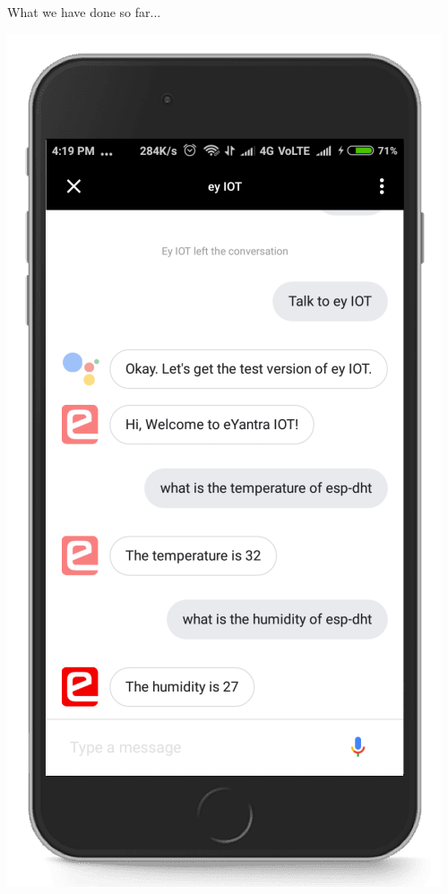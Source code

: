 \documentclass[10pt, a4paper]{beamer}
\begin{document}
\begin{frame}{What we have done so far...}
\begin{minipage}[b]{0.45\textwidth}
		\includegraphics[totalheight=6cm]{assistant.png}
	\end{minipage}%
\end{frame}
\end{document}
